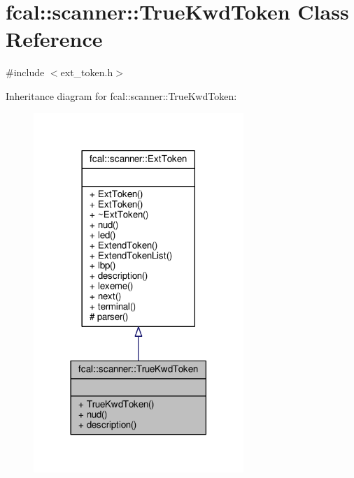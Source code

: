 \hypertarget{classfcal_1_1scanner_1_1TrueKwdToken}{}\section{fcal\+:\+:scanner\+:\+:True\+Kwd\+Token Class Reference}
\label{classfcal_1_1scanner_1_1TrueKwdToken}


{\ttfamily \#include $<$ext\+\_\+token.\+h$>$}



Inheritance diagram for fcal\+:\+:scanner\+:\+:True\+Kwd\+Token\+:
\nopagebreak
\begin{figure}[H]
\begin{center}
\leavevmode
\includegraphics[width=225pt]{classfcal_1_1scanner_1_1TrueKwdToken__inherit__graph}
\end{center}
\end{figure}


